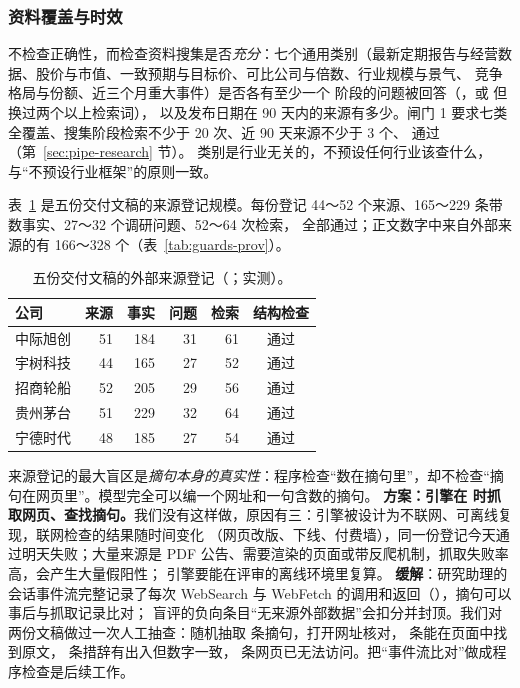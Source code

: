 \subsubsection{资料覆盖与时效}

 不检查正确性，而检查资料搜集是否\emph{充分}：七个通用类别（最新定期报告与经营数据、股价与市值、一致预期与目标价、可比公司与倍数、行业规模与景气、
竞争格局与份额、近三个月重大事件）是否各有至少一个  阶段的问题被回答（，或  但换过两个以上检索词），
以及发布日期在 90 天内的来源有多少。闸门 1 要求七类全覆盖、搜集阶段检索不少于 20 次、近 90 天来源不少于 3 个、 通过（第~\ref{sec:pipe-research} 节）。
类别是行业无关的，不预设任何行业该查什么，与“不预设行业框架”的原则一致。

表~\ref{tab:guards-src-stats} 是五份交付文稿的来源登记规模。每份登记 44～52 个来源、165～229 条带数事实、27～32 个调研问题、52～64 次检索，
 全部通过；正文数字中来自外部来源的有 166～328 个（表~\ref{tab:guards-prov}）。

\begin{table}[t]
\centering
\caption{五份交付文稿的外部来源登记（；实测）。}
\label{tab:guards-src-stats}
\small
\begin{tabular}{@{}lrrrrc@{}}
\toprule
公司 & 来源 & 事实 & 问题 & 检索 & 结构检查 \\
\midrule
中际旭创 & 51 & 184 & 31 & 61 & 通过 \\
宇树科技 & 44 & 165 & 27 & 52 & 通过 \\
招商轮船 & 52 & 205 & 29 & 56 & 通过 \\
贵州茅台 & 51 & 229 & 32 & 64 & 通过 \\
宁德时代 & 48 & 185 & 27 & 54 & 通过 \\
\bottomrule
\end{tabular}
\end{table}

\begin{tradeoff}[：要不要联网回查摘句]
来源登记的最大盲区是\emph{摘句本身的真实性}：程序检查“数在摘句里”，却不检查“摘句在网页里”。模型完全可以编一个网址和一句含数的摘句。
\textbf{方案：引擎在  时抓取网页、查找摘句。}我们没有这样做，原因有三：引擎被设计为不联网、可离线复现，联网检查的结果随时间变化
（网页改版、下线、付费墙），同一份登记今天通过明天失败；大量来源是 PDF 公告、需要渲染的页面或带反爬机制，抓取失败率高，会产生大量假阳性；
引擎要能在评审的离线环境里复算。
\textbf{缓解}：研究助理的会话事件流完整记录了每次 WebSearch 与 WebFetch 的调用和返回（），摘句可以事后与抓取记录比对；
盲评的负向条目“无来源外部数据”会扣分并封顶。我们对两份文稿做过一次人工抽查：随机抽取  条摘句，打开网址核对， 条能在页面中找到原文，
 条措辞有出入但数字一致， 条网页已无法访问。把“事件流比对”做成程序检查是后续工作。
\end{tradeoff}


